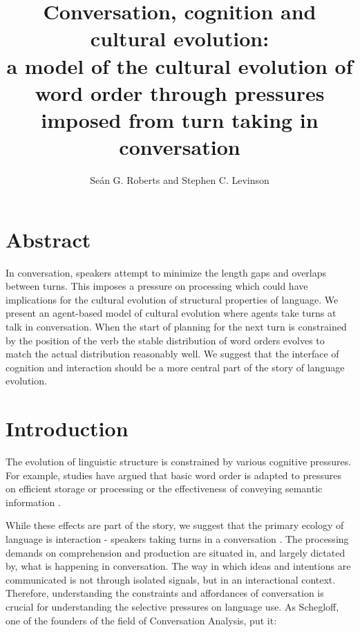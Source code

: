 \documentclass[12pt]{article}
\title{Conversation, cognition and cultural evolution: \\a model of the cultural evolution of word order through pressures imposed from turn taking in conversation}
\author{Se\'{a}n G. Roberts and Stephen C. Levinson}
\date{} %
\begin{document}
\maketitle

\section*{Abstract}

In conversation, speakers attempt to minimize the length gaps and overlaps between turns.  This imposes a pressure on processing which could have implications for the cultural evolution of structural properties of language.  We present an agent-based model of cultural evolution where agents take turns at talk in conversation.  When the start of planning for the next turn is constrained by the position of the verb the stable distribution of word orders evolves to match the actual distribution reasonably well.  We suggest that the interface of cognition and interaction should be a more central part of the story of language evolution.

\section{Introduction}

The evolution of linguistic structure is constrained by various cognitive pressures. For example, studies have argued that basic word order is adapted to pressures on efficient storage or processing \citep{hawkins1994performance,ferrer2008some} or the effectiveness of conveying semantic information \citep{goldin2008natural,schouwstra2014semantic}. 


%



While these effects are part of the story, we suggest that the primary ecology of language is interaction - speakers taking turns in a conversation \citep{levinson2006human}.   The processing demands on comprehension and production are situated in, and largely dictated by, what is happening in conversation.  The way in which ideas and intentions are communicated is not through isolated signals, but in an interactional context.  Therefore, understanding the constraints and affordances of conversation is crucial for understanding the selective pressures on language use.    As Schegloff, one of the founders of the field of Conversation Analysis, put it: 
\end{document}
